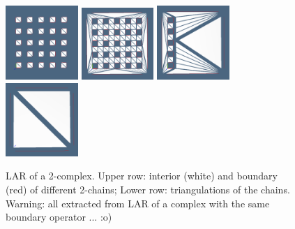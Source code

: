 \documentclass[11pt,oneside]{article}    %
\begin{document}
\begin{figure}[htbp]
   \includegraphics[height=0.245\textwidth,width=0.245\textwidth]{images/reconfig2} 
   \includegraphics[height=0.245\textwidth,width=0.245\textwidth]{images/reconfig4} 
   \includegraphics[height=0.245\textwidth,width=0.245\textwidth]{images/reconfig6} 
   \includegraphics[height=0.245\textwidth,width=0.245\textwidth]{images/reconfig8}
    
   \caption{LAR of a 2-complex. Upper row: interior (white) and boundary (red) of different 2-chains; Lower row: triangulations of the chains. Warning: all extracted from LAR of a complex with the same boundary operator ... :o)}
   \label{fig:squareholes}
\end{figure}
\end{document}
